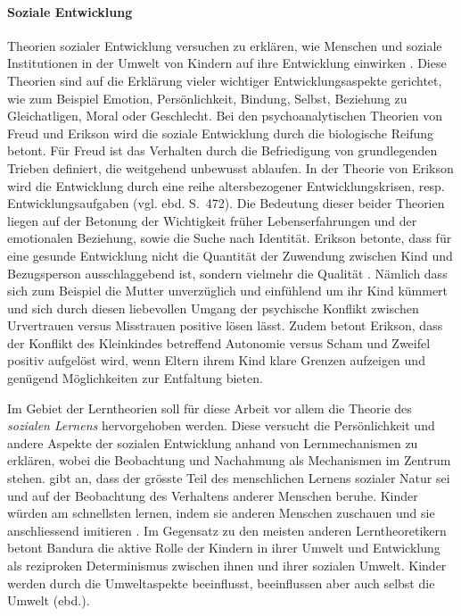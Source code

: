 \paragraph{Soziale Entwicklung}\label{par:SozialeEntwicklung}
Theorien sozialer Entwicklung versuchen zu erklären, wie Menschen und soziale Institutionen in der Umwelt von Kindern auf ihre Entwicklung einwirken \cite[S.~470ff]{Siegler2008}. Diese Theorien sind auf die Erklärung vieler wichtiger Entwicklungsaspekte gerichtet, wie zum Beispiel Emotion, Persönlichkeit, Bindung, Selbst, Beziehung zu Gleichatligen, Moral oder Geschlecht. Bei den psychoanalytischen Theorien von Freud und Erikson wird die soziale Entwicklung  durch die biologische Reifung betont. Für Freud ist das Verhalten durch die Befriedigung von grundlegenden Trieben definiert, die weitgehend unbewusst ablaufen. In der Theorie von Erikson wird die Entwicklung durch eine reihe altersbezogener Entwicklungskrisen, resp. Entwicklungsaufgaben  (vgl. ebd. S.~472). Die Bedeutung dieser beider Theorien liegen auf der Betonung der Wichtigkeit früher Lebenserfahrungen und der emotionalen Beziehung, sowie die Suche nach Identität. Erikson betonte, dass für eine gesunde Entwicklung nicht die Quantität der Zuwendung zwischen Kind und Bezugsperson ausschlaggebend ist, sondern vielmehr die Qualität \cite[S.~243]{Berk2011}. Nämlich dass sich zum Beispiel die Mutter unverzüglich und einfühlend um ihr Kind kümmert und sich durch diesen liebevollen Umgang der psychische Konflikt zwischen Urvertrauen versus Misstrauen positive lösen lässt. Zudem betont Erikson, dass der Konflikt des Kleinkindes betreffend Autonomie versus Scham und Zweifel positiv aufgelöst wird, wenn Eltern ihrem Kind klare Grenzen aufzeigen und genügend Möglichkeiten zur Entfaltung bieten. 

Im Gebiet der Lerntheorien soll für diese Arbeit vor allem die Theorie des \textit{sozialen Lernens} hervorgehoben werden. Diese versucht die Persönlichkeit und andere Aspekte der sozialen Entwicklung anhand von Lernmechanismen zu erklären, wobei die Beobachtung und Nachahmung als Mechanismen im Zentrum stehen.  gibt an, dass der grösste Teil des menschlichen Lernens sozialer Natur sei und auf der Beobachtung des Verhaltens anderer Menschen beruhe. Kinder würden am schnellsten lernen, indem sie anderen Menschen zuschauen und sie anschliessend imitieren \cite[S.~482ff]{Siegler2008}. Im Gegensatz zu den meisten anderen Lerntheoretikern betont Bandura die aktive Rolle der Kindern in ihrer Umwelt und Entwicklung als reziproken Determinismus zwischen ihnen und ihrer sozialen Umwelt. Kinder werden durch die Umweltaspekte beeinflusst, beeinflussen aber auch selbst die Umwelt (ebd.). 


